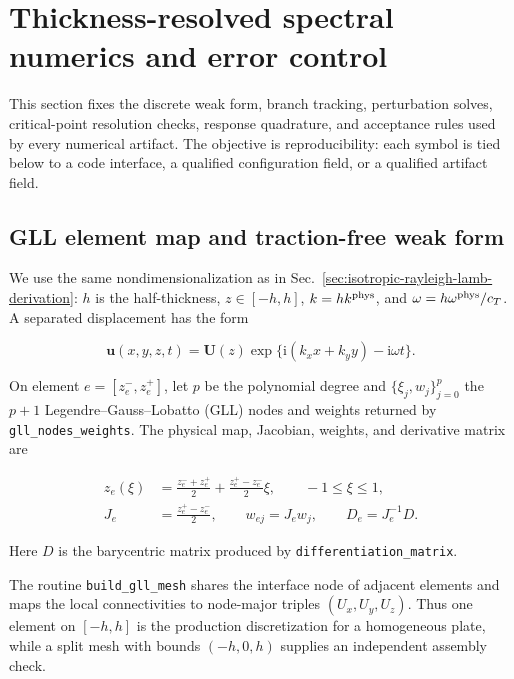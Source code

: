 
\section{Thickness-resolved spectral numerics and error control}
\label{sec:spectral-numerics}

This section fixes the discrete weak form, branch tracking, perturbation
solves, critical-point resolution checks, response quadrature, and acceptance
rules used by every numerical artifact.  The objective is reproducibility:
each symbol is tied below to a code interface, a qualified configuration
field, or a qualified artifact field.

\subsection{GLL element map and traction-free weak form}

We use the same nondimensionalization as in
Sec.~\ref{sec:isotropic-rayleigh-lamb-derivation}: \(h\) is the half-thickness,
\(z\in[-h,h]\), \(k=h k^{\rm phys}\), and
\(\omega=h\omega^{\rm phys}/c_T\).  A separated displacement has the form

\[
 \boldsymbol u(x,y,z,t)=\boldsymbol U(z)
 \exp\{\mathrm i(k_x x+k_y y)-\mathrm i\omega t\}.
\]

On element \(e=[z_e^-,z_e^+]\), let \(p\) be the polynomial degree and
\(\{\xi_j,w_j\}_{j=0}^{p}\) the \(p+1\) Legendre--Gauss--Lobatto (GLL)
nodes and weights returned by \texttt{gll\_nodes\_weights}.  The physical
map, Jacobian, weights, and derivative matrix are

\begin{equation}
 \begin{aligned}
 z_e(\xi)&=\frac{z_e^-+z_e^+}{2}
            +\frac{z_e^+-z_e^-}{2}\xi,\qquad -1\leq\xi\leq1,\\
 J_e&=\frac{z_e^+-z_e^-}{2},\qquad
 w_{ej}=J_e w_j,\qquad D_e=J_e^{-1}D .
 \end{aligned}
 \label{eq:gll-element-map}
\end{equation}

Here \(D\) is the barycentric matrix produced by
\texttt{differentiation\_matrix}.

The routine \texttt{build\_gll\_mesh}
shares the interface node of adjacent elements and maps the local
connectivities to node-major triples
\((U_x,U_y,U_z)\).  Thus one element on \([-h,h]\) is the production
discretization for a homogeneous plate, while a split mesh with bounds
\((-h,0,h)\) supplies an independent assembly check.


